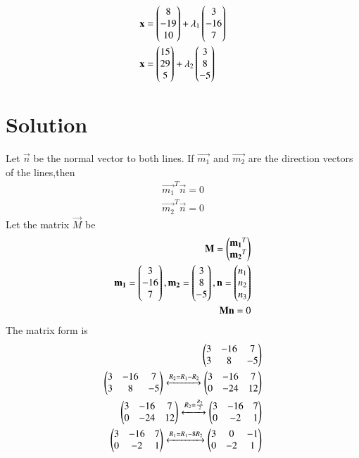 \documentclass[journal,12pt,twocolumn]{IEEEtran}
\begin{document}
\begin{align}   
\mathbf{x} &=\begin{pmatrix} 8\\ -19\\ 10\end{pmatrix} + \lambda_1\begin{pmatrix} 3 \\-16\\ 7\end{pmatrix} \\
\mathbf{x} &=\begin{pmatrix}15\\ 29\\ 5\end{pmatrix} + \lambda_2\begin{pmatrix} 3 \\8\\ -5\end{pmatrix} 
\end{align}


\section{Solution}
Let $\vec{n}$ be the normal vector to both lines. If $\vec{m_1}$ and $\vec{m_2}$ are the direction vectors of the lines,then
\begin{align}
\vec{m_1}^T  \vec{n} = 0 \\  
\vec{m_2}^T\vec{n} = 0    
\end{align}
Let the matrix $\vec{M}$ be
\begin{align}
\mathbf{M}=\begin{pmatrix}\mathbf{m_1}^T\\\mathbf{m_2}^T\end{pmatrix}\\
\mathbf{m_1}=\begin{pmatrix}3\\-16\\7\end{pmatrix} ,  \mathbf{m_2}=\begin{pmatrix}3\\8\\-5\end{pmatrix},\mathbf{n}=\begin{pmatrix}n_1\\n_2\\n_3\end{pmatrix} \\
\mathbf{M}\mathbf{n}=0
\end{align}
The matrix form is
\begin{align}
	\begin{pmatrix}3 & -16 & 7 \\ 3 & 8 & -5\end{pmatrix}\\
	\begin{pmatrix}3 & -16 & 7 \\ 3 & 8 & -5 \end{pmatrix} \xleftrightarrow{R_2=R_1-R_2}\begin{pmatrix}3 & -16 & 7 \\ 0 & -24 & 12 \end{pmatrix}\\
	\begin{pmatrix}3 & -16 & 7 \\ 0 & -24 & 12\end{pmatrix}\xleftrightarrow{R_2=\frac{R_2}{2}}\begin{pmatrix}3 & -16 & 7 \\ 0 & -2 & 1 \end{pmatrix}\\
	\begin{pmatrix}3 & -16 & 7 \\ 0 & -2 & 1 \end{pmatrix}\xleftrightarrow{R_1=R_1 -8R_2}\begin{pmatrix}3 & 0 & -1 \\ 0 & -2 & 1\end{pmatrix}
\end{align}
\end{document}
